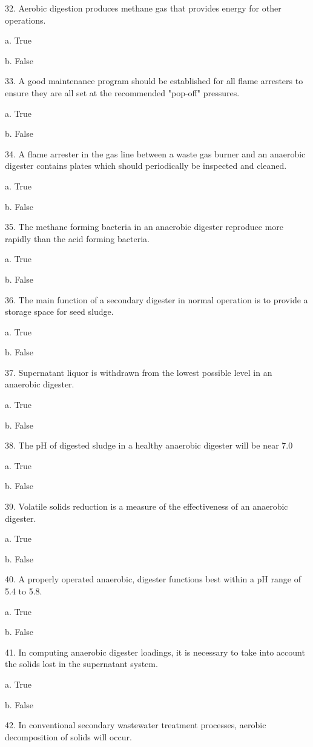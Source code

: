 \documentclass{article}
\begin{document}
32. Aerobic digestion produces methane gas that provides energy for other operations. 

a. True 

b. False 


33. A good maintenance program should be established for all flame arresters to ensure they are all set at the recommended "pop-off" pressures. 

a. True 

b. False 


34. A flame arrester in the gas line between a waste gas burner and an anaerobic digester contains plates which should periodically be inspected and cleaned. 

a. True 

b. False 


35. The methane forming bacteria in an anaerobic digester reproduce more rapidly than the acid forming bacteria. 

a. True 

b. False 


36. The main function of a secondary digester in normal operation is to provide a storage space for seed sludge. 

a. True 

b. False 


37. Supernatant liquor is withdrawn from the lowest possible level in an anaerobic digester. 

a. True 

b. False 


38. The pH of digested sludge in a healthy anaerobic digester will be near 7.0 

a. True 

b. False 


39. Volatile solids reduction is a measure of the effectiveness of an anaerobic digester. 

a. True 

b. False 


40. A properly operated anaerobic, digester functions best within a pH range of 5.4 to 5.8. 

a. True 

b. False 


41. In computing anaerobic digester loadings, it is necessary to take into account the solids lost in the supernatant system. 

a. True 

b. False 


42. In conventional secondary wastewater treatment processes, aerobic decomposition of solids will occur. 
\end{document}
